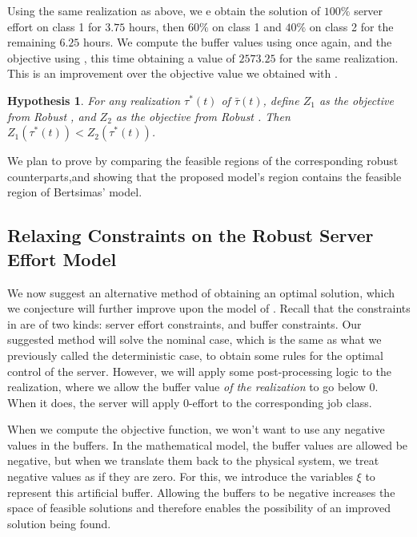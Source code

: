 \documentclass[11pt,a4paper,titlepage]{article}
\theoremstyle{definition}
\theoremstyle{plain}
\newtheorem{claim}{Hypothesis}
\begin{document}
    Using the same realization as above,
    we e obtain the solution of $100\%$
    server effort on class 1 for $3.75$ hours,
    then $60\%$ on class 1 and $40\%$
    on class 2 for the remaining $6.25$ hours.
    We compute the buffer values using  once again,
    and the objective using ,
    this time obtaining a value of $2573.25$ for the same realization.
    This is an improvement over the objective value we obtained with \modelone.

    \begin{claim}
        \label{claim:modelone-better}
        For any realization $\tau^*(t)$ of $\bar{\tau}(t)$,
        define $Z_1$ as the objective from Robust \modelone,
        and $Z_2$ as the objective from Robust \modeltwo.
        Then $Z_1(\tau^*(t)) < Z_2(\tau^*(t))$.
    \end{claim}

    We plan to prove  by comparing the feasible regions of the corresponding robust counterparts,and showing that the proposed model’s region contains the feasible region of Bertsimas’ model.

    \subsection{Relaxing Constraints on the Robust Server Effort Model}

    We now suggest an alternative method of obtaining an optimal solution,
    which we conjecture will further improve upon the model of
    .
    Recall that the constraints in 
    are of two kinds:
    server effort constraints,
    and buffer constraints.
    Our suggested method will solve the nominal case,
    which is the same as what we previously called the deterministic case,
    to obtain some rules for the optimal control of the server.
    However,
    we will apply some post-processing logic to the realization,
    where we allow the buffer value \textit{of the realization}
    to go below $0$.
    When it does,
    the server will apply $0$-effort to the corresponding job class.

    When we compute the objective function,
    we won't want to use any negative values in the buffers.
    In the mathematical model,
    the buffer values are allowed be negative,
    but when we translate them back to the physical system,
    we treat negative values as if they are zero.
    For this,
    we introduce the variables $\xi$ to represent this artificial buffer.
    Allowing the buffers to be negative increases the space of feasible solutions and therefore enables the possibility of an improved solution being found.
\end{document}
